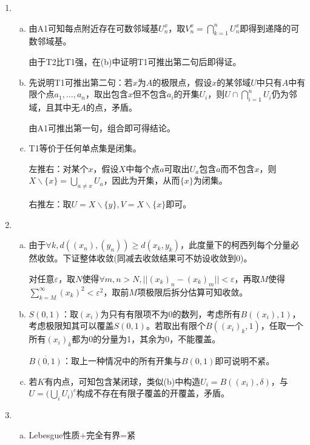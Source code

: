 \documentclass[a4paper,UTF8,fontset=windows]{ctexart}
\begin{document}
\begin{enumerate}[(1)]
    \item
    \begin{enumerate}[(a)]
    \item
    由A1可知每点附近存在可数邻域基$U_n^x$，取$V_n^x=\bigcap_{k=1}^nU_n^x$即得到递降的可数邻域基。
    
    由于T2比T1强，在(b)中证明T1可推出第二句后即得证。
    
    \item
    先说明T1可推出第二句：若$x$为$A$的极限点，假设$x$的某邻域$U$中只有$A$中有限个点$a_1,\dots,a_n$，取出包含$x$但不包含$a_i$的开集$U_i$，则$U\cap\bigcap_{i=1}^nU_i$仍为邻域，且其中无$A$的点，矛盾。
    
    由A1可推出第一句，组合即可得结论。
    
    \item
    T1等价于任何单点集是闭集。
    
    左推右：对某个$x$，假设$X$中每个点$a$可取出$U_a$包含$a$而不包含$x$，则$X\backslash\{x\}=\bigcup_{a\ne x}U_a$，因此为开集，从而$\{x\}$为闭集。
    
    右推左：取$U=X\backslash\{y\},V=X\backslash\{x\}$即可。
    \end{enumerate}
    
    \item
    \begin{enumerate}[(a)]
    \item
    由于$\forall k,d((x_n),(y_n))\ge d(x_k,y_k)$，此度量下的柯西列每个分量必然收敛。下证整体收敛(同减去收敛结果可不妨设收敛到0)。
    
    对任意$\varepsilon$，取$N$使得$\forall m,n>N,||(x_k)_n-(x_k)_m||<\varepsilon$，再取$M$使得$\sum_{k=M}^\infty (x_k)^2<\varepsilon^2$，取前$M$项极限后拆分估算可知收敛。
    
    \item
    $S(0,1)$：取$(x_i)$为只有有限项不为0的数列，考虑所有$B((x_i),1)$，考虑极限知其可以覆盖$S(0,1)$。若取出有限个$B((x_i)_k,1)$，任取一个所有$(x_i)_k$都为0的分量为1，其余为0，不能覆盖。
    
    $\overline{B(0,1)}$：取上一种情况中的所有开集与$B(0,1)$即可说明不紧。
    
    \item
    若$K$有内点，可知包含某闭球，类似(b)中构造$U_i=B((x_i),\delta)$，与$U=\big(\bigcup_iU_i\big)^c$构成不存在有限子覆盖的开覆盖，矛盾。
    \end{enumerate}
    
    \item
    \begin{enumerate}[(a)]
    \item
    Lebesgue性质+完全有界=紧
    

\end{enumerate}
\end{enumerate}
\end{document}
